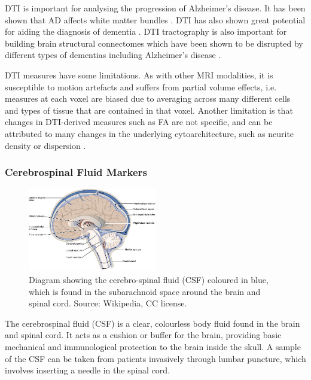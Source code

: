 DTI is important for analysing the progression of Alzheimer's disease. It has been shown that AD affects white matter bundles \cite{sachdev2013alzheimer}. DTI has also shown great potential for aiding the diagnosis of dementia \cite{bozzali2002white,zhang2009white}. DTI tractography is also important for building brain structural connectomes which have been shown to be disrupted by different types of dementias including Alzheimer's disease \cite{seeley2009neurodegenerative, zhou2012predicting}.

DTI measures have some limitations. As with other MRI modalities, it is susceptible to motion artefacts and suffers from partial volume effects, i.e. measures at each voxel are biased due to averaging across many different cells and types of tissue that are contained in that voxel. Another limitation is that changes in DTI-derived measures such as FA are not specific, and can be attributed to many changes in the underlying cytoarchitecture, such as neurite density or dispersion \cite{zhang2012noddi}. 

\subsubsection{Cerebrospinal Fluid Markers}
\label{sec:bckCsf}

\begin{figure}
\centering
\includegraphics[width=0.5\textwidth]{images/CSF_diagram}
\caption[Diagram showing the cerebro-spinal fluid (CSF).]{Diagram showing the cerebro-spinal fluid (CSF) coloured in blue, which is found in the subarachnoid space around the brain and spinal cord. Source: Wikipedia\footnotemark, CC license.}
\label{fig:bckCsfDiagram}
\end{figure}

The cerebrospinal fluid (CSF) is a clear, colourless body fluid found in the brain and spinal cord. It acts as a cushion or buffer for the brain, providing basic mechanical and immunological protection to the brain inside the skull. A sample of the CSF can be taken from patients invasively through lumbar puncture, which involves inserting a needle in the spinal cord.

